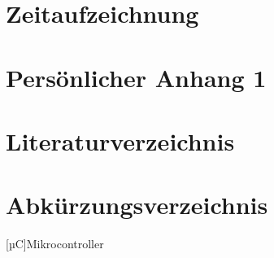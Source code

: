 

\renewcommand\appendixname{Anhang}
\renewcommand\appendixpagename{Anhang}
\renewcommand\appendixtocname{Anhang}

\lohead{}

\appendix
\begingroup
\makeatletter
\let\ps@plain\ps@empty
\appendixpage
\makeatother
\endgroup

\chapter{Zeitaufzeichnung}
\chapter{Persönlicher Anhang 1}

\markboth{}{}	%

\chapter{Literaturverzeichnis}


\chapter{Abkürzungsverzeichnis}
\begin{acronym}
	[µC]{Mikrocontroller}
\end{acronym}

\listoffigures
\listoftables
\lstlistoflistings